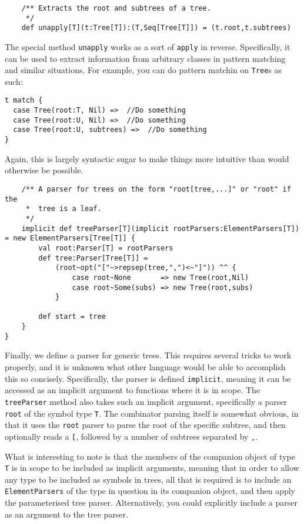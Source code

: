 \begin{verbatim}
    /** Extracts the root and subtrees of a tree.
     */
    def unapply[T](t:Tree[T]):(T,Seq[Tree[T]]) = (t.root,t.subtrees)
\end{verbatim}

The special method \texttt{unapply} works as a sort of \texttt{apply} in
reverse. Specifically, it can be used to extract information from arbitrary
classes in pattern matching and similar situations. For example, you can do
pattern matchin on \texttt{Tree}s as such:

\begin{verbatim}
t match {
  case Tree(root:T, Nil) =>  //Do something 
  case Tree(root:U, Nil) =>  //Do something
  case Tree(root:U, subtrees) =>  //Do something
}
\end{verbatim}

Again, this is largely syntactic sugar to make things more intuitive than
would otherwise be possible.

\begin{verbatim}
    /** A parser for trees on the form "root[tree,...]" or "root" if the
     *  tree is a leaf. 
     */
    implicit def treeParser[T](implicit rootParsers:ElementParsers[T]) = new ElementParsers[Tree[T]] {
        val root:Parser[T] = rootParsers
        def tree:Parser[Tree[T]] =
            (root~opt("["~>repsep(tree,",")<~"]")) ^^ {
                case root~None       => new Tree(root,Nil)
                case root~Some(subs) => new Tree(root,subs)
            }

        def start = tree
    }
}
\end{verbatim}

Finally, we define a parser for generic trees. This requires several tricks
to work properly, and it is unknown what other language would be able to
accomplish this so concisely. Specifically, the parser is defined
\texttt{implicit}, meaning it can be accessed as an implicit argument to
functions where it is in scope. The \texttt{treeParser} method also takes
such an implicit argument, specifically a parser \texttt{root} of the
symbol type \texttt{T}. The combinator parsing itself is somewhat obvious,
in that it uses the \texttt{root} parser to parse the root of the specific
subtree, and then optionally reads a \texttt{[}, followed by a number of
subtrees separated by \texttt{,}.

What is interesting to note is that the members of the companion object of
type \texttt{T} is in scope to be included as implicit arguments, meaning
that in order to allow any type to be included as symbols in trees, all
that is required is to include an \texttt{ElementParsers} of the type in
question in its companion object, and then apply the parameterised tree
parser. Alternatively, you could explicitly include a parser as an argument
to the tree parser. %

